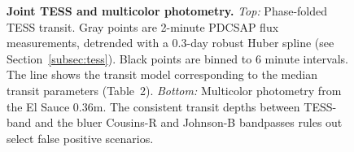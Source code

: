 \documentclass[12pt,twocolumn,tighten]{aastex62}
\begin{document}
\begin{figure}[t]
	\begin{center}
		\leavevmode
		
		\vspace{-0.5cm}
	\end{center}
	\vspace{-0.7cm}
	\caption{ {\bf Joint TESS and multicolor photometry.}
    {\it Top:} Phase-folded TESS transit. Gray points are 2-minute
    PDCSAP flux measurements, detrended with a 0.3-day robust Huber
    spline (see Section~\ref{subsec:tess}).  Black points are binned
    to 6 minute intervals.  The line shows the transit model
    corresponding to the median transit parameters (Table~2).
    {\it Bottom:} Multicolor photometry from the El Sauce 0.36m.
    The consistent transit depths between TESS-band and the bluer
    Cousins-R and Johnson-B bandpasses rules out select false positive
    scenarios.
		\label{fig:jointphot}
	}
\end{figure}
\end{document}
